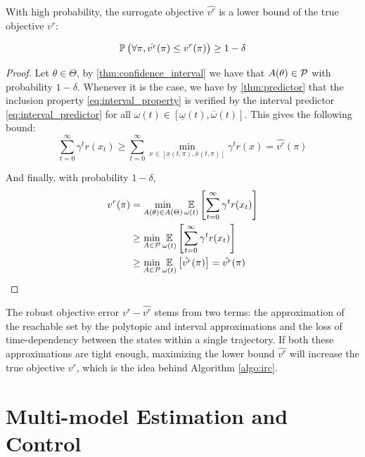 \documentclass{article}
\begin{document}
\begin{property}
\label{prop:lower-bound}
With high probability, the surrogate objective $\hat{v^r}$ is a lower bound of the true objective $v^r$:

\begin{equation}
\mathbb{P}\left(\forall \pi, \hat{v^r}(\pi) \leq v^r(\pi)\right) \geq 1-\delta
\end{equation}
\end{property}

\begin{proof}
Let $\theta\in\Theta$, by \autoref{thm:confidence_interval} we have that $A(\theta) \in \mathcal{P}$ with probability $1-\delta$. Whenever it is the case, we have by \autoref{thm:predictor} that the inclusion property \eqref{eq:interval_property} is verified by the interval predictor \eqref{eq:interval_predictor} for all $\omega(t)\in[\underline{\omega}(t), \overline{\omega}(t)]$. This gives the following bound:
\begin{equation*}
 \sum_{t=0}^\infty \gamma^t r(x_t) \geq \sum_{t=0}^\infty \min_{x\in[\underline{x}(t, \pi), \overline{x}(t, \pi)]} \gamma^t r(x) = \hat{v^r}(\pi)
\end{equation*}

And finally, with probability $1-\delta$,
\begin{align*}
v^r(\pi) &= \min_{A(\theta) \in A(\Theta)} \operatorname*{\mathbb{E}}\limits_{\omega(t)}\left[\sum_{t=0}^\infty \gamma^t r(x_t)\right] \\
&\geq \min_{A \in \mathcal{P}} \operatorname*{\mathbb{E}}\limits_{\omega(t)}\left[\sum_{t=0}^\infty \gamma^t r(x_t)\right] \\
& \geq \min_{A \in \mathcal{P}} \operatorname*{\mathbb{E}}\limits_{\omega(t)}\left[\hat{v^r}(\pi)\right] = \hat{v^r}(\pi)
\end{align*}
\end{proof}

The robust objective error $v^r - \hat{v^r}$ stems from two terms: the approximation of the reachable set by the polytopic and interval approximations and the loss of time-dependency between the states within a single trajectory. If both these approximations are tight enough, maximizing the lower bound $\hat{v^r}$ will increase the true objective $v^r$, which is the idea behind Algorithm \ref{algo:irc}.

\section{Multi-model Estimation and Control}
\end{document}
